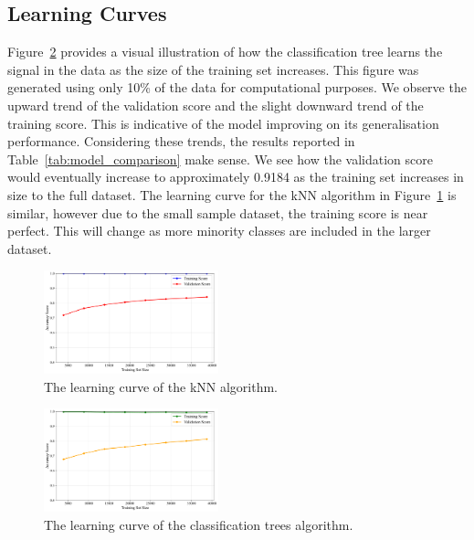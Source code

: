 \documentclass[10pt, conference]{IEEEtran}
\begin{document}
\subsection{Learning Curves}
Figure~\ref{fig:dt-learning} provides a visual illustration of how the classification tree learns the signal in the data as the size of the training set increases. This figure was generated using only 10\% of the data for computational purposes. We observe the upward trend of the validation score and the slight downward trend of the training score. This is indicative of the model improving on its generalisation performance. Considering these trends, the results reported in Table~\ref{tab:model_comparison} make sense. We see how the validation score would eventually increase to approximately 0.9184 as the training set increases in size to the full dataset. The learning curve for the kNN algorithm in Figure~\ref{fig:knn-learning} is similar, however due to the small sample dataset, the training score is near perfect. This will change as more minority classes are included in the larger dataset.

\begin{figure}[htbp]
	\centering
	\includegraphics[width=0.45\textwidth]{../plots/knn_learning_curve.pdf}
	\caption{The learning curve of the kNN algorithm.}
	\label{fig:knn-learning}
\end{figure}

\begin{figure}[htbp]
	\centering
	\includegraphics[width=0.45\textwidth]{../plots/dt_learning_curve.pdf}
	\caption{The learning curve of the classification trees algorithm.}
	\label{fig:dt-learning}
\end{figure}
\end{document}
